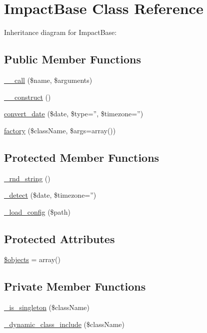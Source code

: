 \hypertarget{classImpactBase}{
\section{ImpactBase Class Reference}
\label{classImpactBase}
}


Inheritance diagram for ImpactBase:
\subsection*{Public Member Functions}
\begin{DoxyCompactItemize}
\item 
\hyperlink{classImpactBase_a3815af62ed9d37b2dcaa175379bbfeca}{\_\-\_\-call} (\$name, \$arguments)
\item 
\hyperlink{classImpactBase_a095c5d389db211932136b53f25f39685}{\_\-\_\-construct} ()
\item 
\hyperlink{classImpactBase_a1fbc5fa684cb87ef9cc0afeb96e50121}{convert\_\-date} (\$date, \$type='', \$timezone='')
\item 
\hyperlink{classImpactBase_adf86e5676e8ec50965d7b3436a1f1d4f}{factory} (\$className, \$args=array())
\end{DoxyCompactItemize}
\subsection*{Protected Member Functions}
\begin{DoxyCompactItemize}
\item 
\hyperlink{classImpactBase_a1ff6b5b97cfc56fb8fde66a6a86e97b9}{\_\-rnd\_\-string} ()
\item 
\hyperlink{classImpactBase_af3690b8603e5a936765d05c5c28c6a37}{\_\-detect} (\$date, \$timezone='')
\item 
\hyperlink{classImpactBase_ac3c8987c95826d5c587c1d4580a52767}{\_\-load\_\-config} (\$path)
\end{DoxyCompactItemize}
\subsection*{Protected Attributes}
\begin{DoxyCompactItemize}
\item 
\hyperlink{classImpactBase_a255f6b6db4c45b1418e9c15cf4e2bcdd}{\$objects} = array()
\end{DoxyCompactItemize}
\subsection*{Private Member Functions}
\begin{DoxyCompactItemize}
\item 
\hyperlink{classImpactBase_a997bfc96bda0d6cdeaab739245e65940}{\_\-is\_\-singleton} (\$className)
\item 
\hyperlink{classImpactBase_a8c5c06d20ac508ba8176d806ec4e7095}{\_\-dynamic\_\-class\_\-include} (\$className)
\end{DoxyCompactItemize}
